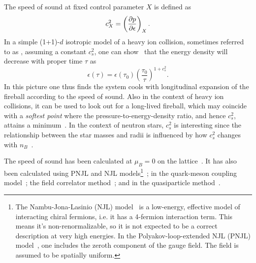 
The speed of sound at fixed control parameter $X$ is defined as
\begin{equation}
  c_X^2=\left(\pder[p]{\epsilon}\right)_X.
\end{equation}
In a simple (1+1)-$d$ isotropic model of a heavy ion collision, 
sometimes referred to as , 
assuming a constant $c_s^2$, one can show~\cite{bjorken_highly_1983} 
that the energy density will decrease with proper time $\tau$ as
\begin{equation}
  \epsilon(\tau)=\epsilon(\tau_0)\left(\frac{\tau_0}{\tau}\right)^{1+c_s^2}.
\end{equation}
In this picture one thus finds the system cools with longitudinal expansion
of the fireball according to the speed of sound. %
Also in the context of heavy ion collisions, it can be used to look out
for a long-lived fireball, which may coincide with a {\it softest point}
 where the pressure-to-energy-density ratio,
and hence $c_s^2$, attains a minimum~\cite{hung_hydrodynamics_1995}.
In the context of neutron stars, $c_s^2$ is interesting since the relationship
between the star masses and radii is influenced by how $c_s^2$ changes with
$n_B$~\cite{ozel_masses_2016}.

The speed of sound has been calculated at $\mu_B=0$ on the 
lattice~\cite{borsanyi_qcd_2010,bazavov_equation_2014,borsanyi_full_2014}.
It has also been calculated using PNJL and NJL 
models\footnote{The Nambu-Jona-Lasinio (NJL)
model~\cite{nambu_dynamical_1961,nambu_dynamical_1961-1} is a low-energy,
effective model of interacting chiral fermions, i.e. it has a 4-fermion
interaction term. This means it's non-renormalizable, so it is not expected
to be a correct description at very high energies.
In the Polyakov-loop-extended NJL (PNJL) model~\cite{meisinger_chiral_1996}, 
one includes the zeroth component of the gauge field. The field is assumed to
be spatially uniform.}~\cite{ghosh_susceptibilities_2006,marty_transport_2013,deb_estimating_2016,motta_isentropic_2020,zhao_thermodynamic_2020};
in the quark-meson coupling
model~\cite{schaefer_thermodynamics_2010,abhishek_transport_2018};
the field correlator
method~\cite{khaidukov_speed_2018,khaidukov_thermodynamics_2019};
and in the quasiparticle method~\cite{mykhaylova_impact_2021}.




